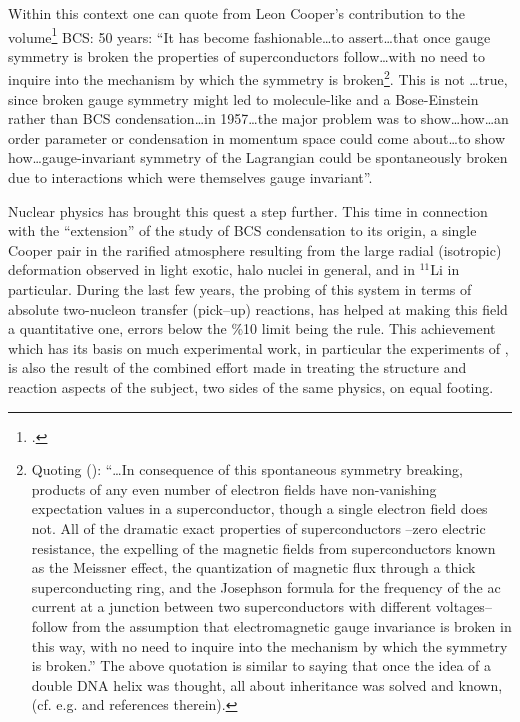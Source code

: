  Within this context one can quote from Leon Cooper's contribution to the volume\footnote{\cite{Cooper:11}.} BCS: 50 years: ``It has become fashionable\dots to assert\dots that once gauge symmetry is broken the properties of superconductors follow\dots with no need to inquire into the mechanism by which the symmetry is broken\footnote{Quoting (\cite{Weinberg:11}): ``\dots In consequence of this spontaneous symmetry breaking, products of any even number of electron fields have non-vanishing expectation values in a superconductor, though a single electron field does not. All of the dramatic exact properties of superconductors --zero electric resistance, the expelling of the magnetic fields from superconductors known as the Meissner effect, the quantization of magnetic flux through a thick superconducting ring, and the Josephson formula for the frequency of the ac current at a junction between two superconductors with different voltages-- follow from the assumption that electromagnetic gauge invariance is broken in this way, with no need to inquire into the mechanism by which the symmetry is broken.'' The above quotation is similar to saying that once the idea of a double DNA helix was thought, all about inheritance was solved and known, (cf. e.g. \cite{Stent:80} and references therein).}. This is not \dots true, since broken gauge symmetry might led to molecule-like and a Bose-Einstein rather than BCS condensation\dots in 1957\dots the major problem was to show\dots how\dots an order parameter or condensation in momentum space could come about\dots to show how\dots gauge-invariant symmetry of the Lagrangian could be spontaneously broken due to interactions which were themselves gauge invariant''.


Nuclear physics has brought this quest a step further. This time in connection with the ``extension'' of the study of BCS condensation to its origin, a single Cooper pair in the rarified atmosphere resulting from the large radial (isotropic) deformation observed in light exotic, halo nuclei in general, and in $^{11}$Li in particular. During the last few years, the probing of this system in terms of absolute two-nucleon transfer (pick--up) reactions, has helped at making this field a quantitative one, errors below the \%10 limit being the rule. This achievement which has its basis on much experimental work, in particular the  experiments of \cite{Tanihata:08}, is also the result of the combined effort made in treating the structure and reaction aspects of the subject, two sides of the same physics, on equal footing. 
